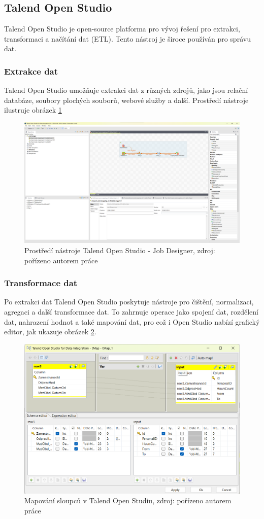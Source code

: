 \subsection{Talend Open Studio}

Talend Open Studio je open-source platforma pro vývoj řešení pro extrakci, transformaci a načítání dat (ETL). Tento nástroj je široce používán pro správu dat.

\subsubsection{Extrakce dat}
Talend Open Studio umožňuje extrakci dat z různých zdrojů, jako jsou relační databáze, soubory plochých souborů, webové služby a další. Prostředí nástroje ilustruje obrázek \ref{fig:TalendJobDesigner}

\begin{figure}
    \centering
    \includegraphics[width=0.75\linewidth]{img/Talend prostředí.png}
    \caption{Prostředí nástroje Talend Open Studio - Job Designer, zdroj: pořízeno autorem práce}
    \label{fig:TalendJobDesigner}
\end{figure}

\subsubsection{Transformace dat}
Po extrakci dat Talend Open Studio poskytuje nástroje pro čištění, normalizaci, agregaci a další transformace dat.
To zahrnuje operace jako spojení dat, rozdělení dat, nahrazení hodnot a také mapování dat, pro což i Open Studio nabízí grafický editor, jak ukazuje obrázek \ref{fig:TalendColumnMapping}.

\begin{figure}
    \centering
    \includegraphics[width=0.6\linewidth]{img/Talend Column mapping.png}
    \caption{Mapování sloupců v Talend Open Studiu, zdroj: pořízeno autorem práce}
    \label{fig:TalendColumnMapping}
\end{figure}

